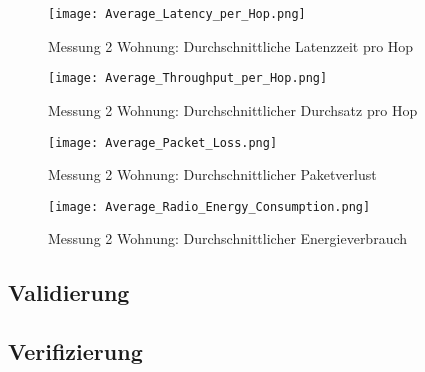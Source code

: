 \begin{figure}[!htbp]
\centering
\begin{minipage}[b]{0.49\textwidth}
		\centering
		\texttt{[image: Average\_Latency\_per\_Hop.png]}
		\caption{Messung 2 Wohnung: Durchschnittliche Latenzzeit pro Hop}
		\label{fig:DurchschnittlicheLatenzzeit}
\end{minipage}
\begin{minipage}[b]{0.49\textwidth}
		\centering
		\texttt{[image: Average\_Throughput\_per\_Hop.png]}
		\caption{Messung 2 Wohnung: Durchschnittlicher Durchsatz pro Hop}
		\label{fig:DurchschnittlicherDurchsatz}
\end{minipage}
\end{figure}


\begin{figure}[!htbp]
\centering
\begin{minipage}[b]{0.49\textwidth}
		\centering
		\texttt{[image: Average\_Packet\_Loss.png]}
		\caption{Messung 2 Wohnung: Durchschnittlicher Paketverlust}
		\label{fig:DurchschnittlicherPaketverlust}
\end{minipage}
\begin{minipage}[b]{0.49\textwidth}
		\centering
		\texttt{[image: Average\_Radio\_Energy\_Consumption.png]}
		\caption{Messung 2 Wohnung: Durchschnittlicher Energieverbrauch}
		\label{fig:DurchschnittlicherEnergieverbrauch}
\end{minipage}
\end{figure}







\subsection{Validierung}\label{subsec:Validierung}



\subsection{Verifizierung}\label{subsec:Verifizierung}





